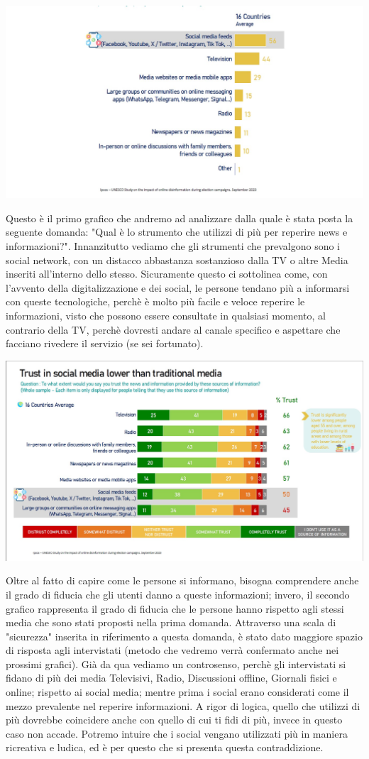 \documentclass{article}
\begin{document}
\centering\includegraphics[width=0.5\linewidth]{Immagini/Grafico1.jpg}\\
    \begin{justify}
    Questo è il primo grafico che andremo ad analizzare dalla quale è stata posta la seguente domanda: "Qual è lo strumento che utilizzi di più per reperire news e informazioni?".
    Innanzitutto vediamo che gli strumenti che prevalgono sono i social network, con un distacco abbastanza sostanzioso dalla TV o altre Media inseriti all'interno dello stesso. Sicuramente questo ci sottolinea come, con l'avvento della digitalizzazione e dei social, le persone tendano più a informarsi con queste tecnologiche, perchè è molto più facile e veloce reperire le informazioni, visto che possono essere consultate in qualsiasi momento, al contrario della TV, perchè dovresti andare al canale specifico e aspettare che facciano rivedere il servizio (se sei fortunato).
\begin{center}
\includegraphics[width=0.5\linewidth]{Immagini/Grafico2.jpg}\\
\end{center}
    Oltre al fatto di capire come le persone si informano, bisogna comprendere anche il grado di fiducia che gli utenti danno a queste informazioni; invero, il secondo grafico rappresenta il grado di fiducia che le persone hanno rispetto agli stessi media che sono stati proposti nella prima domanda.
    Attraverso una scala di "sicurezza" inserita in riferimento a questa domanda, è stato dato maggiore spazio di risposta agli intervistati (metodo che vedremo verrà confermato anche nei prossimi grafici).
    Già da qua vediamo un controsenso, perchè gli intervistati si fidano di più dei media Televisivi, Radio, Discussioni offline, Giornali fisici e online; rispetto ai social media; mentre prima i social erano considerati come il mezzo prevalente nel reperire informazioni. A rigor di logica, quello che utilizzi di più dovrebbe coincidere anche con quello di cui ti fidi di più, invece in questo caso non accade. Potremo intuire che i social vengano utilizzati più in maniera ricreativa e ludica, ed è per questo che si presenta questa contraddizione.

\end{justify}
\end{document}
